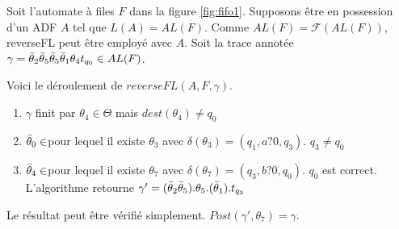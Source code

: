 Soit l'automate à files $F$ dans la figure \ref{fig:fifo1}. Supposons être en possession d'un ADF $A$ tel que $L(A)=AL(F)$.
Comme $AL(F)=\mathcal{F}(AL(F))$, reverseFL peut être employé avec $A$.
Soit la trace annotée $\gamma=\bar{\theta}_2\bar{\theta}_5\bar{\theta}_5\bar{\theta}_1\theta_4 t_{q_0} \in AL(F)$.

Voici le déroulement de $reverseFL(A,F,\gamma)$.

\begin{enumerate}
  \item $\gamma$ finit par $\theta_4\in\Theta$ mais $dest(\theta_4)\neq q_0$
  \item $\bar{\theta}_0\in$\barTheta pour lequel il existe $\theta_3$ avec $\delta(\theta_3)=(q_1,a?0,q_3)$. $q_3\neq q_0$
  \item $\bar{\theta}_4\in$\barTheta pour lequel il existe $\theta_7$ avec $\delta(\theta_7)=(q_3,b?0,q_0)$. $q_0$ est correct. L'algorithme retourne $\gamma'=(\bar{\theta}_2\bar{\theta}_5).\theta_5.(\bar{\theta}_1).t_{q_3}$
\end{enumerate}

Le résultat peut être vérifié simplement. $Post(\gamma',\theta_7)=\gamma$.

